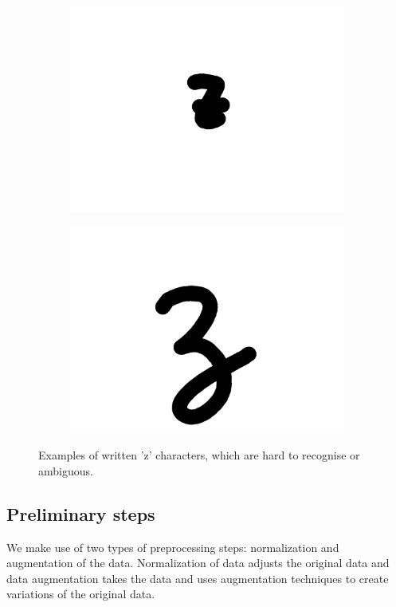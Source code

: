 \documentclass{article}
\begin{document}
\begin{figure}
\begin{subfigure}{.23\textwidth}
  \centering
  \includegraphics[width=\linewidth]{images/bad_char1}
\end{subfigure}
\begin{subfigure}{.23\textwidth}
  \centering
  \includegraphics[width=\linewidth]{images/bad_char2}
\end{subfigure}
\caption{Examples of written 'z' characters, which are hard to recognise or ambiguous.}
\label{fig:char}
\end{figure}


\subsection{Preliminary steps}
\label{sec:preproc}
We make use of two types of preprocessing steps: normalization and augmentation of the data. Normalization of data adjusts the original data and data augmentation takes the data and uses augmentation techniques to create variations of the original data.
\end{document}
